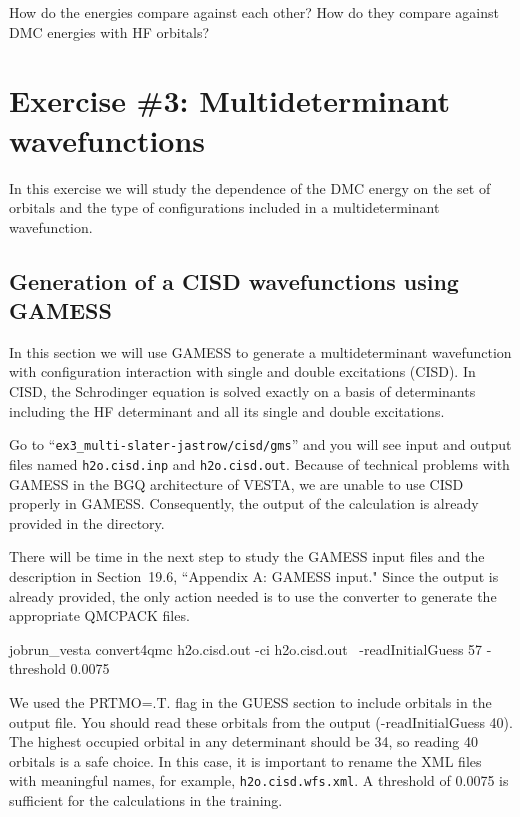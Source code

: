 How do the energies compare against each other? How do they compare against DMC
energies with HF orbitals?
\section{Exercise \#3: Multideterminant wavefunctions}
In this exercise we will study the dependence of the DMC energy on the set of orbitals
and the type of configurations included in a multideterminant wavefunction. 

\subsection{Generation of a CISD wavefunctions using GAMESS}
In this section we will use GAMESS to generate a multideterminant wavefunction with
configuration interaction with single and double excitations (CISD). In CISD, the Schrodinger equation is solved exactly on a basis of determinants 
including the HF determinant and all its single and double excitations. 

Go to ``\texttt{ex3\_multi-slater-jastrow/cisd/gms}'' and you will see input and output files named \texttt{h2o.cisd.inp} and \texttt{h2o.cisd.out}. Because of technical problems with GAMESS in the BGQ architecture of VESTA, we are unable to use CISD properly in GAMESS. Consequently, the output of the calculation is already provided in the directory. 


There will be time in the next step to study the GAMESS input
files and the description in Section~19.6, ``Appendix A: GAMESS input." %
Since the output is already provided, the
only action needed is to use the converter to generate the appropriate QMCPACK files.  %
\begin{shade}
jobrun_vesta convert4qmc h2o.cisd.out -ci h2o.cisd.out \
-readInitialGuess 57 -threshold 0.0075
\end{shade}

We used the PRTMO=.T. flag in the GUESS section to include orbitals in the output file. You should read these orbitals from the output (-readInitialGuess 40).
The highest occupied orbital in any determinant should be 34, so reading 40 orbitals is a safe choice. In this case, it is important to rename the XML files with meaningful names, for example, \texttt{h2o.cisd.wfs.xml}. A threshold of 0.0075 is sufficient for the calculations in the training.


